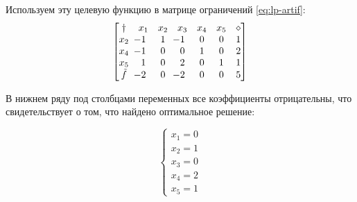 Используем эту целевую функцию в матрице ограничений \eqref{eq:lp-artif}:
\begin{equation*}
  \begin{bmatrix}
    \dagger & x_1 & x_2 & x_3 & x_4 & x_5 & \diamond\\
    x_2 &\mm{1}& 1 &\mm{1}& 0 & 0 & 1\\
    x_4 &\mm{1}& 0 &  0 & 1 & 0 & 2\\
    x_5 &  1 & 0 &  2 & 0 & 1 & 1\\
    \tilde{f} & \mm{2} & 0 & \mm{2} & 0 & 0 & 5
  \end{bmatrix}
\end{equation*}

В нижнем ряду под столбцами переменных все коэффициенты отрицательны,
что свидетельствует о том, что найдено оптимальное решение:

\begin{equation}
  \begin{cases}
    x_1 = 0\\
    x_2 = 1\\
    x_3 = 0\\
    x_4 = 2\\
    x_5 = 1
  \end{cases}
\end{equation}
